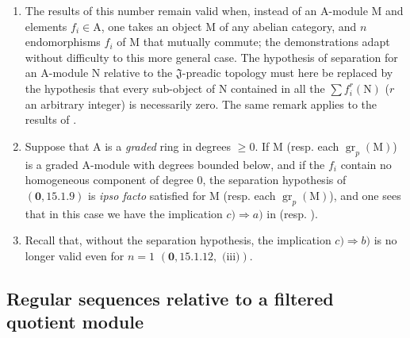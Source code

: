\begin{remarks}[19.5.6]
\label{IV.19.5.6}
\medskip\noindent
\begin{enumerate}
\item[\rm(i)] The results of this number remain valid when, instead of an $\mathrm{A}$-module $\mathrm{M}$ and elements $f_i\in\mathrm{A}$, one takes an object $\mathrm{M}$ of any abelian category, and $n$ endomorphisms $f_i$ of $\mathrm{M}$ that mutually commute; the demonstrations adapt without difficulty to this more general case. The hypothesis of separation for an $\mathrm{A}$-module $\mathrm{N}$ relative to the $\mathfrak{J}$-preadic topology must here be replaced by the hypothesis that every sub-object of $\mathrm{N}$ contained in all the $\sum f_i^r(\mathrm{N})$ ($r$ an arbitrary integer) is necessarily zero. The same remark applies to the results of .
\item[\rm(ii)] Suppose that $\mathrm{A}$ is a \emph{graded} ring in degrees $\geq0$. If $\mathrm{M}$ (resp. each $\operatorname{gr}_p(\mathrm{M})$) is a graded $\mathrm{A}$-module with degrees bounded below, and if the $f_i$ contain no homogeneous component of degree $0$, the separation hypothesis of $(\mathbf{0},15.1.9)$ is \emph{ipso facto} satisfied for $\mathrm{M}$ (resp. each $\operatorname{gr}_p(\mathrm{M})$), and one sees that in this case we have the implication $c)\Rightarrow a)$ in  (resp. ).
\item[\rm(iii)] Recall that, without the separation hypothesis, the implication $c)\Rightarrow b)$ is no longer valid even for $n=1$ $(\mathbf{0},15.1.12,\text{ (iii)})$.
\end{enumerate}
\end{remarks}

\subsection{Regular sequences relative to a filtered quotient module}
\label{subsection:IV.19.6}

